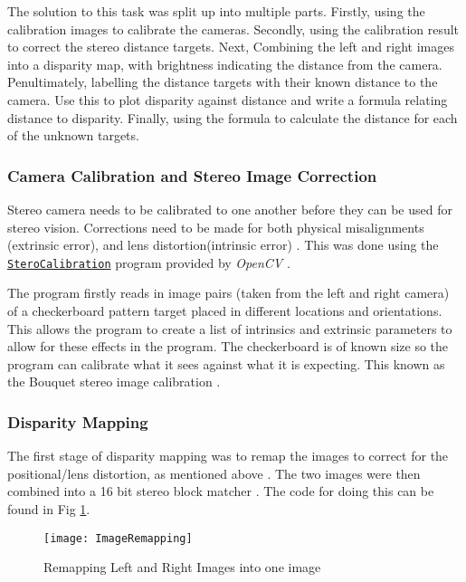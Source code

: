 \documentclass[conference]{IEEEtran}
\begin{document}
The solution to this task was split up into multiple parts. Firstly, using the calibration images to calibrate the cameras. Secondly, using the calibration result to correct the stereo distance targets. Next, Combining the left and right images into a disparity map, with brightness indicating the distance from the camera. Penultimately, labelling the distance targets with their known distance to the camera. Use this to plot disparity against distance and write a formula relating distance to disparity. Finally, using the formula to calculate the distance for each of the unknown targets.

\subsubsection{Camera Calibration and Stereo Image Correction}

Stereo camera needs to be calibrated to one another before they can be used for stereo vision. Corrections need to be made for both physical misalignments (extrinsic error), and lens distortion(intrinsic error) \cite{Stero_Calibration}. This was done using the \href{https://docs.opencv.org/2.4/modules/calib3d/doc/camera_calibration_and_3d_reconstruction.html?highlight=stereocalibration}{\texttt{SteroCalibration}} program provided by \textit{OpenCV} \cite{Book_Calibration}.

The program firstly reads in image pairs (taken from the left and right camera) of a checkerboard pattern target placed in different locations and orientations. This allows the program to create a list of intrinsics and extrinsic parameters to allow for these effects in the program. The checkerboard is of known size so the program can calibrate what it sees against what it is expecting. This known as the Bouquet stereo image calibration \cite{Bouget}.

\subsubsection{Disparity Mapping} \label{Disparity_Mapping}

The first stage of disparity mapping was to remap the images to correct for the positional/lens distortion, as mentioned above \cite{OpenCV_Remapping}. The two images were then combined into a 16 bit stereo block matcher \cite{Stereo_Block_Matching}. The code for doing this can be found in Fig \ref{fig:ImageRemapping}.

\begin{figure}[H]
\centerline{\texttt{[image: ImageRemapping]}}
\caption{Remapping Left and Right Images into one image}
\label{fig:ImageRemapping}
\end{figure}
\end{document}
